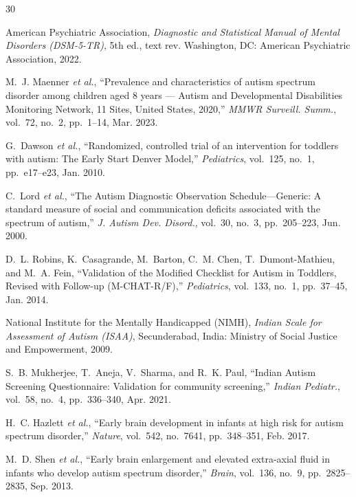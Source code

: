 \documentclass[conference]{IEEEtran}
\begin{document}
\begin{thebibliography}{30}

American Psychiatric Association, \emph{Diagnostic and Statistical Manual of Mental Disorders (DSM-5-TR)}, 5th ed., text rev. Washington, DC: American Psychiatric Association, 2022.

M.~J. Maenner \emph{et al.}, ``Prevalence and characteristics of autism spectrum disorder among children aged 8 years --- Autism and Developmental Disabilities Monitoring Network, 11 Sites, United States, 2020,'' \emph{MMWR Surveill. Summ.}, vol.~72, no.~2, pp.~1--14, Mar. 2023.

G.~Dawson \emph{et al.}, ``Randomized, controlled trial of an intervention for toddlers with autism: The Early Start Denver Model,'' \emph{Pediatrics}, vol.~125, no.~1, pp.~e17--e23, Jan. 2010.

C.~Lord \emph{et al.}, ``The Autism Diagnostic Observation Schedule---Generic: A standard measure of social and communication deficits associated with the spectrum of autism,'' \emph{J. Autism Dev. Disord.}, vol.~30, no.~3, pp.~205--223, Jun. 2000.

D.~L. Robins, K.~Casagrande, M.~Barton, C.~M. Chen, T.~Dumont-Mathieu, and M.~A. Fein, ``Validation of the Modified Checklist for Autism in Toddlers, Revised with Follow-up (M-CHAT-R/F),'' \emph{Pediatrics}, vol.~133, no.~1, pp.~37--45, Jan. 2014.

National Institute for the Mentally Handicapped (NIMH), \emph{Indian Scale for Assessment of Autism (ISAA)}, Secunderabad, India: Ministry of Social Justice and Empowerment, 2009.

S.~B. Mukherjee, T.~Aneja, V.~Sharma, and R.~K. Paul, ``Indian Autism Screening Questionnaire: Validation for community screening,'' \emph{Indian Pediatr.}, vol.~58, no.~4, pp.~336--340, Apr. 2021.

H.~C. Hazlett \emph{et al.}, ``Early brain development in infants at high risk for autism spectrum disorder,'' \emph{Nature}, vol.~542, no.~7641, pp.~348--351, Feb. 2017.

M.~D. Shen \emph{et al.}, ``Early brain enlargement and elevated extra-axial fluid in infants who develop autism spectrum disorder,'' \emph{Brain}, vol.~136, no.~9, pp.~2825--2835, Sep. 2013.


\end{thebibliography}
\end{document}
